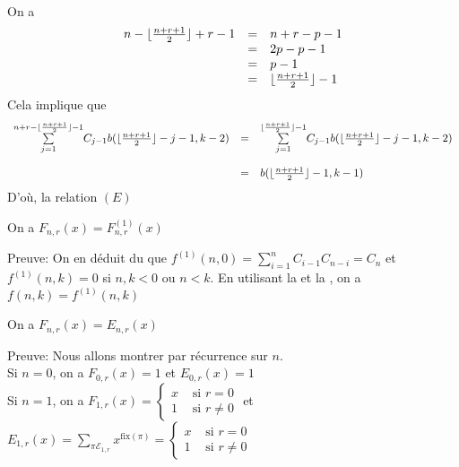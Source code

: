 \vspace{10pt}\\
On a
\[
	\begin{array}{l l l}
		n-\lfloor \frac{n+r+1}{2}\rfloor+r-1 & = & n+r-p-1 \\&=&2p-p-1\\&=&p-1\\&=&\lfloor \frac{n+r+1}{2}\rfloor-1
	\end{array}
\]
Cela implique que
\[
	\begin{array}{l l l}
		\underset{j=1}{\overset{n+r-\lfloor \frac{n+r+1}{2} \rfloor-1}{\sum}}C_{j-1}b(\lfloor \frac{n+r+1}{2} \rfloor-j-1,k-2) & =        & \underset{j=1}{\overset{\lfloor \frac{n+r+1}{2} \rfloor-1}{\sum}}C_{j-1}b(\lfloor \frac{n+r+1}{2} \rfloor-j-1,k-2) \\
		                                                                                                                       & \text{ } &                                                                                                                    \\
		                                                                                                                       & =        & b( \lfloor \frac{n+r+1}{2} \rfloor -1 , k-1)
	\end{array}
\]
D’où, la relation $(E)$
\begin{corollaire}
	On a $F_{n, r}(x) =  F^{(1)}_{n,r}(x)$
\end{corollaire}
Preuve: On en déduit du  que $f^{(1)}(n, 0) = \sum\limits_{i=1}^{n}C_{i-1}C_{n-i}= C_{n}$ et \\ $f^{(1)}(n, k)=0$ si $n, k < 0$ ou $n<k$. En utilisant la  et la , on a $f(n, k)=f^{(1)}(n, k)$
\begin{corollaire}
	On a $F_{n, r}(x) = E_{n, r}(x)$
\end{corollaire}
Preuve: Nous allons montrer par récurrence sur $n$. \\
Si $n=0$, on a  $F_{0, r}(x)=1$ et $E_{0, r}(x)=1$\\
Si $n=1$, on a $F_{1, r}(x)=\begin{cases}
		x & \text{ si } r=0     \\
		1 & \text{ si } r\neq 0
	\end{cases}$ et $E_{1, r}(x)= \sum\limits_{\pi \mathcal{E}_{1,r}}x^{\text{fix}(\pi)} =\begin{cases}
		x & \text{ si } r=0     \\
		1 & \text{ si } r\neq 0
	\end{cases}$\\
